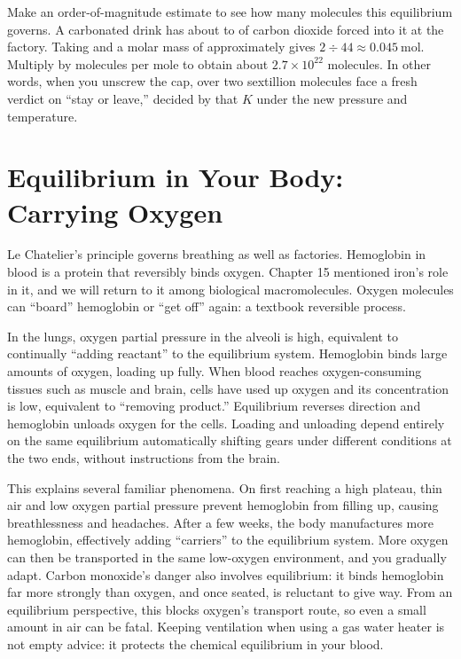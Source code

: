 Make an order-of-magnitude estimate to see how many molecules this equilibrium governs. A  carbonated drink has about  to  of carbon dioxide forced into it at the factory. Taking  and a molar mass of approximately  gives $2\div 44\approx 0.045\ \mathrm{mol}$. Multiply by  molecules per mole to obtain about $2.7\times 10^{22}$ molecules. In other words, when you unscrew the cap, over two sextillion molecules face a fresh verdict on ``stay or leave,'' decided by that $K$ under the new pressure and temperature.

\section{Equilibrium in Your Body: Carrying Oxygen}

Le Chatelier's principle governs breathing as well as factories. Hemoglobin in blood is a protein that reversibly binds oxygen. Chapter 15 mentioned iron's role in it, and we will return to it among biological macromolecules. Oxygen molecules can ``board'' hemoglobin or ``get off'' again: a textbook reversible process.

In the lungs, oxygen partial pressure in the alveoli is high, equivalent to continually ``adding reactant'' to the equilibrium system. Hemoglobin binds large amounts of oxygen, loading up fully. When blood reaches oxygen-consuming tissues such as muscle and brain, cells have used up oxygen and its concentration is low, equivalent to ``removing product.'' Equilibrium reverses direction and hemoglobin unloads oxygen for the cells. Loading and unloading depend entirely on the same equilibrium automatically shifting gears under different conditions at the two ends, without instructions from the brain.

This explains several familiar phenomena. On first reaching a high plateau, thin air and low oxygen partial pressure prevent hemoglobin from filling up, causing breathlessness and headaches. After a few weeks, the body manufactures more hemoglobin, effectively adding ``carriers'' to the equilibrium system. More oxygen can then be transported in the same low-oxygen environment, and you gradually adapt. Carbon monoxide's danger also involves equilibrium: it binds hemoglobin far more strongly than oxygen, and once seated, is reluctant to give way. From an equilibrium perspective, this blocks oxygen's transport route, so even a small amount in air can be fatal. Keeping ventilation when using a gas water heater is not empty advice: it protects the chemical equilibrium in your blood.

